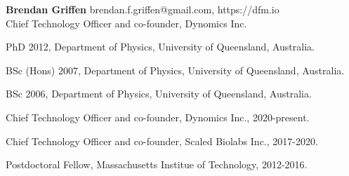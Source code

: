 \documentclass[12pt,letterpaper]{article}
\begin{document}
\thispagestyle{empty}\sloppy\sloppypar\raggedbottom

\textbf{\Large Brendan Griffen} \hfill
\textsf{\small brendan.f.griffen@gmail.com, https://dfm.io} \\[0.5ex]
Chief Technology Officer and co-founder, Dynomics Inc.\\[0.5ex]

\begin{list}{}{\cvlist}
  \item
        PhD 2012,  Department of Physics, University of Queensland, Australia.
  \item
        BSc (Hons) 2007, Department of Physics, University of Queensland, Australia.
  \item
        BSc 2006, Department of Physics, University of Queensland, Australia.
\end{list}


\begin{list}{}{\cvlist}
  \item
        Chief Technology Officer and co-founder, Dynomics Inc., 2020-present.
  \item
        Chief Technology Officer and co-founder, Scaled Biolabs Inc., 2017-2020.
  \item
        Postdoctoral Fellow, Massachusetts Institue of Technology, 2012-2016.
\end{list}


\ifdefined\withpubs
  

  \begin{list}{}{\cvlist}
    
  \end{list}

  \begin{list}{}{\cvlist}
    
  \end{list}
\fi
\end{document}
